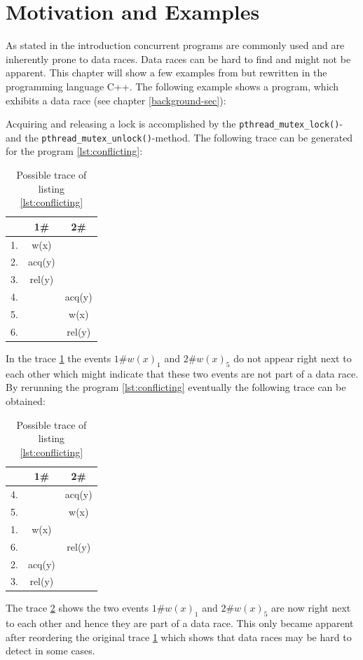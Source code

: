 \documentclass[12pt]{article}
\begin{document}
	\section{Motivation and Examples}
	As stated in the introduction concurrent programs are commonly used and are inherently prone to data races. Data races can be hard to find and might not be apparent. This chapter will show a few examples from \cite{sulzmann2} but rewritten in the programming language C++. The following example shows a program, which exhibits a data race (see chapter \ref{background-sec}):
	
	Acquiring and releasing a lock is accomplished by the \texttt{pthread\_mutex\_lock()}- and the \texttt{pthread\_mutex\_unlock()}-method. The following trace can be generated for the program \ref{lst:conflicting}:
	\begin{table}[H]
		\begin{center}
			\begin{tabular}{ c c c}
				& 1\# & 2\# \\
				\hline
				1. & w(x) & \\
				2. & acq(y) & \\
				3. & rel(y) & \\
				4. & & acq(y) \\
				5. & & w(x) \\
				6. & & rel(y) \\
			\end{tabular}
			\caption{Possible trace of listing \ref{lst:conflicting}}
			\label{trace1}
		\end{center}
	\end{table}
	In the trace \ref{trace1} the events $1\#w(x)_1$ and $2\#w(x)_5$ do not appear right next to each other which might indicate that these two events are not part of a data race. By rerunning the program \ref{lst:conflicting} eventually the following trace can be obtained:
	\begin{table}[H]
		\begin{center}
			\begin{tabular}{ c c c}
				& 1\# & 2\# \\
				\hline
				4. & & acq(y) \\
				5. & & w(x) \\
				1. & w(x) & \\
				6. &  & rel(y) \\
				2. & acq(y) & \\
				3. & rel(y) & \\
			\end{tabular}
			\caption{Possible trace of listing \ref{lst:conflicting}}
			\label{trace2}
		\end{center}
	\end{table}
	The trace \ref{trace2} shows the two events $1\#w(x)_1$ and $2\#w(x)_5$ are now right next to each other and hence they are part of a data race. This only became apparent after reordering the original trace \ref{trace1} which shows that data races may be hard to detect in some cases.
\end{document}
